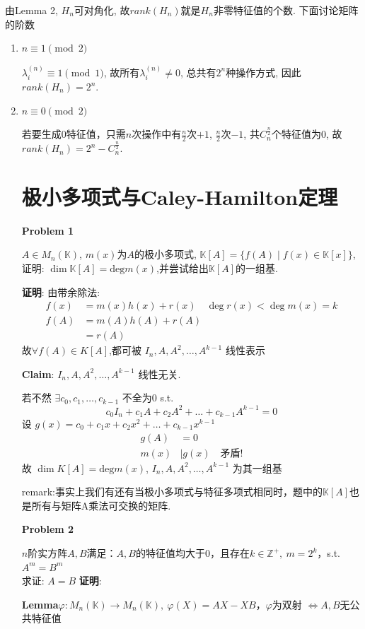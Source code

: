由Lemma 2, $H_n$可对角化, 故$rank(H_n)$就是$H_n$非零特征值的个数.
下面讨论矩阵的阶数
\begin{enumerate}
\item[(1)] $n \equiv 1 \pmod{2}$

$\lambda_i^{(n)} \equiv 1 \pmod{1}$, 故所有$\lambda_i^{(n)} \neq 0$, 总共有$2^n$种操作方式, 因此 $rank(H_n) = 2^n$.

\item[(2)] $n \equiv 0 \pmod{2}$

若要生成0特征值，只需$n$次操作中有$\frac{n}{2}$次$+1$, $\frac{n}{2}$次$-1$, 共$C_n^{\frac{n}{2}}$个特征值为$0$,
故
$rank(H_n) = 2^n - C_n^{\frac{n}{2}}$.
\section{极小多项式与Caley-Hamilton定理}
\textbf{Problem 1}

$A \in M_n(\mathbb{K})$, $m(x)$为$A$的极小多项式, $\mathbb{K}[A] = \{f(A) \mid f(x) \in \mathbb{K}[x]\}$, 证明: $\dim \mathbb{K}[A]=\mathrm{deg}m(x)$,并尝试给出$\mathbb{K}[A]$的一组基.

\textbf{证明}: 由带余除法:
\begin{align*}
f(x) &= m(x)h(x)+r(x) \quad \deg r(x) < \deg m(x)=k \\
f(A) &= m(A)h(A)+r(A) \\
&= r(A)
\end{align*}
故$\forall f(A) \in K[A]$,都可被 $I_n, A, A^2, \dots, A^{k-1}$ 线性表示

\textbf{Claim}: $I_n, A, A^2, \dots, A^{k-1}$ 线性无关.

若不然 $\exists c_0, c_1, \dots, c_{k-1}$ 不全为0 s.t.
$$c_0 I_n + c_1 A + c_2 A^2 + \dots + c_{k-1} A^{k-1} = 0$$
设 $g(x) = c_0 + c_1 x + c_2 x^2 + \dots + c_{k-1} x^{k-1}$
\begin{align*}
g(A) &= 0 \\
m(x) &| g(x) \quad 矛盾!
\end{align*}
故 $\dim K[A]=\mathrm{deg}m(x)$, $I_n, A, A^2, \dots, A^{k-1}$ 为其一组基

remark:事实上我们有还有当极小多项式与特征多项式相同时，题中的$\mathbb{K}[A]$也是所有与矩阵A乘法可交换的矩阵.

\textbf{Problem 2}

$n$阶实方阵$A,B$满足：$A,B$的特征值均大于$0$，且存在$k \in \mathbb{Z}^+,\ m=2^k$，s.t. $A^m = B^m$\\
求证: $A=B$
\textbf{证明}:

\textbf{Lemma}$\varphi: M_n(\mathbb{K}) \to M_n(\mathbb{K}),\ \varphi(X) = AX-XB$，$\varphi$为双射 $\iff A,B$无公共特征值


\end{enumerate}
